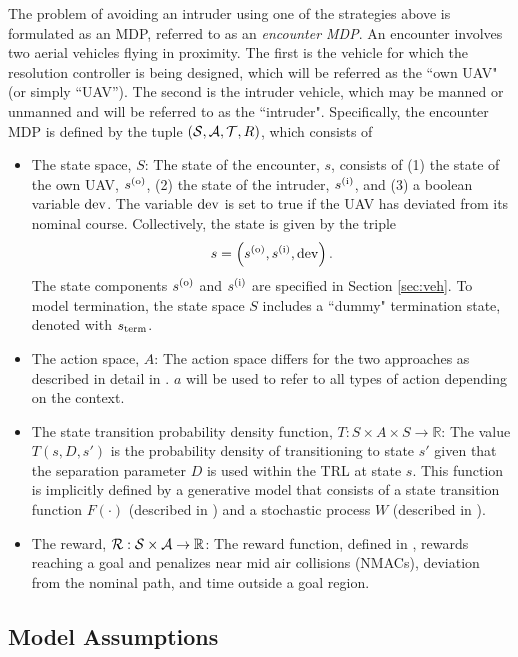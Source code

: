 The problem of avoiding an intruder using one of the strategies above is formulated as an MDP, referred to as an \emph{encounter MDP}. An encounter involves two aerial vehicles flying in proximity. The first is the vehicle for which the resolution controller is being designed, which will be referred as the ``own UAV" (or simply ``UAV''). The second is the intruder vehicle, which may be manned or unmanned and will be referred to as the ``intruder". Specifically, the encounter MDP is defined by the tuple $(\mathcal{S}, \mathcal{A}, \mathcal{T}, R)$, which consists of

\begin{itemize}
    \item The state space, $S$: The state of the encounter, $s$, consists of (1) the state of the own UAV, $s^{(\mathrm{o})}$, (2) the state of the intruder, $s^{(\mathrm{i})}$, and (3) a boolean variable $\mathrm{dev }$. The variable $\mathrm{dev }$ is set to true if the UAV has deviated  from its nominal course. Collectively, the state is given by the triple
        \begin{equation}
            s = \left(s^{(\mathrm{o})}, s^{(\mathrm{i})}, \mathrm{dev }\right) \text{.}
        \end{equation}
        The state components $s^{(\mathrm{o})}$ and $s^{(\mathrm{i})}$ are specified in Section \ref{sec:veh}.
        To model termination, the state space $S$ includes a ``dummy" termination state, denoted with $s_{\mathrm{term}}$.
    \item The action space, $A$: The action space differs for the two approaches as described in detail in . $a$ will be used to refer to all types of action depending on the context.
    \item The state transition probability density function, $T: S \times A \times S \to \mathbb{R}$: The value $T(s,D,s')$ is the probability density of transitioning to state $s'$ given that the separation parameter $D$ is used within the TRL at state $s$. This function is implicitly defined by a generative model that consists of a state transition function $F(\cdot)$ (described in ) and a stochastic process $W$ (described in ).
    \item The reward, $\mathcal{R}:\mathcal{S} \times \mathcal{A} \to \mathbb{R}$: The reward function, defined in , rewards reaching a goal and penalizes near mid air collisions (NMACs), deviation from the nominal path, and time outside a goal region.
\end{itemize}

\subsection{Model Assumptions}\label{sec:assumptions}

